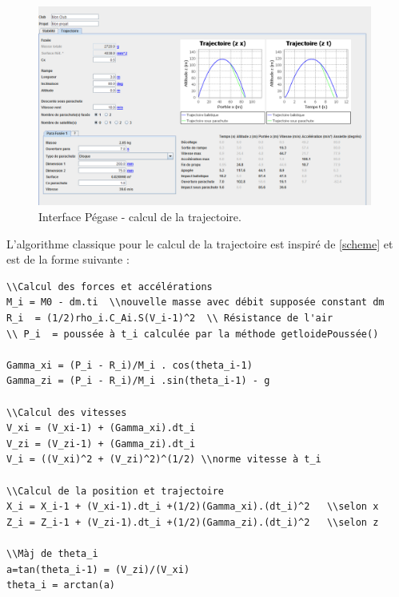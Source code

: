 \documentclass[a4paper]{article}
\begin{document}
\begin{figure}[!htbp]
\begin{center}
\includegraphics[width=11cm]{pegase2.PNG} 
\end{center}
\caption{Interface Pégase - calcul de la trajectoire.}
\label{peg2}
\end{figure}

L'algorithme classique pour le calcul de la trajectoire est inspiré de \ref{scheme} et est de la forme suivante :
\begin{verbatim}
\\Calcul des forces et accélérations 
M_i = M0 - dm.ti  \\nouvelle masse avec débit supposée constant dm
R_i  = (1/2)rho_i.C_Ai.S(V_i-1)^2  \\ Résistance de l'air
\\ P_i  = poussée à t_i calculée par la méthode getloidePoussée()

Gamma_xi = (P_i - R_i)/M_i . cos(theta_i-1)
Gamma_zi = (P_i - R_i)/M_i .sin(theta_i-1) - g

\\Calcul des vitesses
V_xi = (V_xi-1) + (Gamma_xi).dt_i	
V_zi = (V_zi-1) + (Gamma_zi).dt_i
V_i = ((V_xi)^2 + (V_zi)^2)^(1/2) \\norme vitesse à t_i

\\Calcul de la position et trajectoire
X_i = X_i-1 + (V_xi-1).dt_i +(1/2)(Gamma_xi).(dt_i)^2	\\selon x
Z_i = Z_i-1 + (V_zi-1).dt_i +(1/2)(Gamma_zi).(dt_i)^2	\\selon z

\\Màj de theta_i
a=tan(theta_i-1) = (V_zi)/(V_xi)
theta_i = arctan(a)

\end{verbatim}
\end{document}
